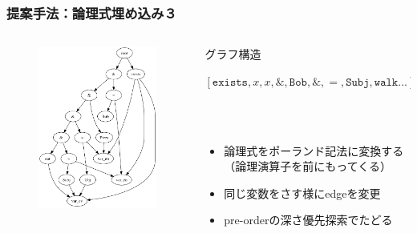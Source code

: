 \documentclass[dvipdfmx]{beamer}
\newcommand{\LF}[1]{\ensuremath{\texttt{#1}}}
\begin{document}
\begin{frame}
\frametitle{提案手法：論理式埋め込み３}
\begin{columns}[t]
    \begin{column}{0.4\textwidth} %
        \begin{figure}[h]
        	\includegraphics[width=4cm]{graph.png}
                \label{fig:graph}
        \end{figure}
    \end{column}
    \begin{column}{0.6\textwidth} %
      \begin{block}{グラフ構造}
        \begin{center}
         $[\LF{exists},x,x,\&,\LF{Bob},\&,=,\LF{Subj},\LF{walk}...]$
         \end{center}
      \end{block}
      \\~\
      \begin{itemize}
        \item 論理式をポーランド記法に変換する\\（論理演算子を前にもってくる）
        \item 同じ変数をさす様にedgeを変更
        \item pre-orderの深さ優先探索でたどる
      \end{itemize}
    \end{column}
\end{columns}

\end{frame}




\end{document}
